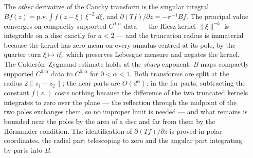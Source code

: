 \begin{theorem}
  \label{thm:beurling}
  \leanok
  The \emph{other} derivative of the Cauchy transform is the singular integral
  $B f(z) = \mathrm{p.v.}\int f(z-\xi)\,\xi^{-2}\,d\xi$, and
  $\partial (Tf)/\partial z = -\pi^{-1} B f$.  The principal value converges on
  compactly supported $C^{0,\alpha}$ data --- the Riesz kernel
  $\lVert\xi\rVert^{-a}$ is integrable on a disc exactly for $a < 2$ --- and the
  truncation radius is immaterial because the kernel has zero mean on every
  annulus centred at its pole, by the quarter turn $\xi \mapsto i\xi$, which
  preserves Lebesgue measure and negates the kernel.  The Calder\'on--Zygmund
  estimate holds at the \emph{sharp} exponent: $B$ maps compactly supported
  $C^{0,\alpha}$ data to $C^{0,\alpha}$ for $0 < \alpha < 1$.  Both transforms
  are split at the radius $2\lVert z_1 - z_2\rVert$; the near parts are
  $O(d^\alpha)$; in the far parts, subtracting the constant $f(z_1)$ costs
  nothing because the difference of the two truncated kernels integrates to zero
  over the plane --- the reflection through the midpoint of the two poles
  exchanges them, so no improper limit is needed --- and what remains is bounded
  near the poles by the area of a disc and far from them by the H\"ormander
  condition.  The identification of $\partial (Tf)/\partial z$ is proved in polar
  coordinates, the radial part telescoping to zero and the angular part
  integrating by parts into $B$.
\end{theorem}

